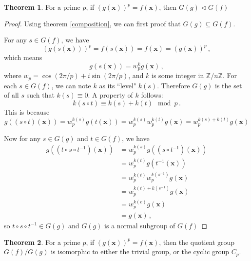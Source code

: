 \documentclass[]{article}
\newcommand{\vx}{\mathbf{x}}
\theoremstyle{definition}\newtheorem{theorem}{Theorem}
\begin{document}
\begin{theorem}
	For a prime $p$, if $(g(\vx))^p = f(\vx)$, then $G(g) \triangleleft G(f)$
\end{theorem}
\begin{proof}
	Using theorem \ref{composition}, we can first proof that $G(g) \subseteq G(f)$.
	
	For any $s \in G(f)$, we have
	\[
		(g(s(\vx)))^p = f(s(\vx)) = f(\vx) = (g(\vx))^p\,,
	\]
	which means
	\[
		g(s(\vx)) = w_p^k g(\vx)\,,
	\]
	where $w_p = \cos(2\pi/p) + i\sin(2\pi/p)$, and $k$ is some integer in $\mathbb{Z}/n\mathbb{Z}$. For each $s \in G(f)$, we can note $k$ as its ``level" $k(s)$. Therefore $G(g)$ is the set of all $s$ such that $k(s) \equiv 0 $. A property of $k$ follows:
	\[
		k(s\circ t) \equiv k(s) + k(t) \mod p\,.
	\]
	This is because
	\[
		g((s\circ t)(\vx)) =  w_p^{k(s)} g(t(\vx)) = w_p^{k(s)}w_p^{k(t)} g(\vx) =  w_p^{k(s) + k(t)} g(\vx)
	\]
	
	Now for any $s \in G(g)$ and $t \in G(f)$, we have
	\begin{align*}
	g((t\circ s \circ t^{-1})(\vx)) &= w_p^{k(s)} g((s \circ t^{-1})(\vx))\\
	&= w_p^{k(t)} g( t^{-1}(\vx))\\
	&= w_p^{k(t)}w_p^{k(s^{-1})} g( \vx)\\
	&= w_p^{k(t)+k(s^{-1})} g( \vx)\\
	&= w_p^{k(e)}g( \vx)\\
	&= g( \vx)\,,
	\end{align*}
	so $t\circ s \circ t^{-1} \in G(g)$ and $G(g)$ is a normal subgroup of $G(f)$
\end{proof}

\begin{theorem}
	\label{cyclic}
	For a prime $p$, if $(g(\vx))^p = f(\vx)$, then the quotient group $G(f) / G(g)$ is isomorphic to either the trivial group, or the cyclic group $C_p$.
\end{theorem}
\end{document}
